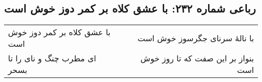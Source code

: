 \begin{center}
\section*{رباعی شماره ۲۳۲: با عشق کلاه بر کمر دوز خوش است}
\label{sec:0232}
\begin{longtable}{l p{0.5cm} r}
با عشق کلاه بر کمر دوز خوش است
&&
با نالهٔ سرنای جگرسوز خوش است
\\
ای مطرب چنگ و نای را تا بسحر
&&
بنواز بر این صفت که تا روز خوش است
\\
\end{longtable}
\end{center}
